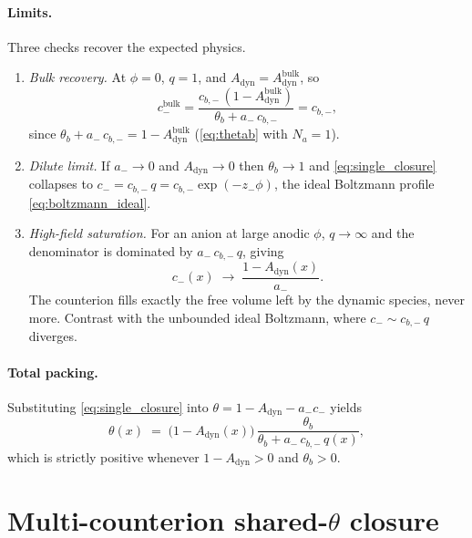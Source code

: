 \documentclass[11pt]{article}
\begin{document}
\paragraph{Limits.}
Three checks recover the expected physics.
\begin{enumerate}
\item \emph{Bulk recovery.} At $\phi = 0$, $q = 1$, and
$A_{\mathrm{dyn}} = A^{\mathrm{bulk}}_{\mathrm{dyn}}$, so
\begin{equation}
c_-^{\mathrm{bulk}}
  = \frac{c_{b,-}\,(1 - A^{\mathrm{bulk}}_{\mathrm{dyn}})}
         {\theta_b + a_-\,c_{b,-}}
  = c_{b,-},
\end{equation}
since $\theta_b + a_-\,c_{b,-} = 1 - A^{\mathrm{bulk}}_{\mathrm{dyn}}$
(\eqref{eq:thetab} with $N_a=1$).

\item \emph{Dilute limit.} If $a_- \to 0$ and $A_{\mathrm{dyn}} \to 0$
then $\theta_b \to 1$ and \eqref{eq:single_closure} collapses to
$c_- = c_{b,-}\,q = c_{b,-}\exp(-z_-\phi)$, the ideal Boltzmann profile
\eqref{eq:boltzmann_ideal}.

\item \emph{High-field saturation.} For an anion at large anodic
$\phi$, $q\to\infty$ and the denominator is dominated by
$a_-\,c_{b,-}\,q$, giving
\begin{equation}
c_-(x) \;\longrightarrow\;
\frac{1 - A_{\mathrm{dyn}}(x)}{a_-}.
\label{eq:saturation}
\end{equation}
The counterion fills exactly the free volume left by the dynamic
species, never more. Contrast with the unbounded ideal Boltzmann, where
$c_- \sim c_{b,-}\,q$ diverges.
\end{enumerate}

\paragraph{Total packing.}
Substituting \eqref{eq:single_closure} into
$\theta = 1 - A_{\mathrm{dyn}} - a_- c_-$ yields
\begin{equation}
\theta(x) \;=\;
\bigl(1 - A_{\mathrm{dyn}}(x)\bigr)\,
\frac{\theta_b}{\theta_b + a_-\,c_{b,-}\,q(x)},
\label{eq:theta_single}
\end{equation}
which is strictly positive whenever $1-A_{\mathrm{dyn}} > 0$ and
$\theta_b > 0$.

\section{\texorpdfstring{Multi-counterion shared-$\theta$ closure}{Multi-counterion shared-theta closure}}
\label{sec:multi}
\end{document}
